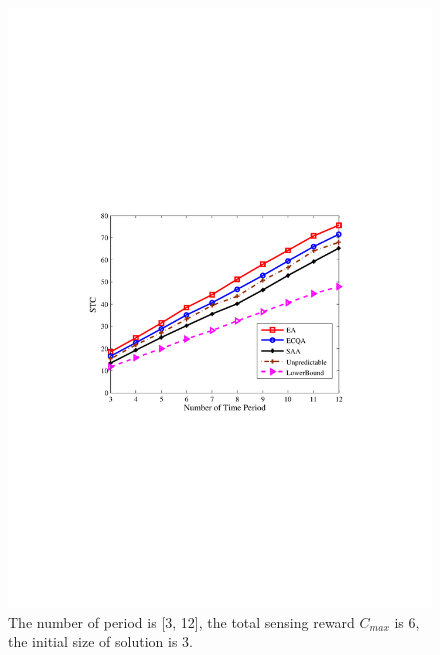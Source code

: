 \documentclass[journal]{IEEEtran}
\begin{document}
\begin{figure}
	\centering
	\includegraphics[width=0.85\linewidth]{figure5.pdf}
	\caption{ The number of period is [3, 12], the total sensing reward $C_{max}$ is 6, the initial size of solution is 3.}
	\label{fig:figure6}
\end{figure}
\end{document}
